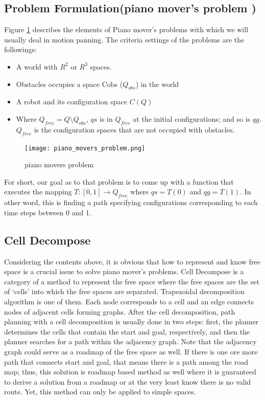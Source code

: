 \documentclass[11pt]{article}
\begin{document}
\subsection{Problem Formulation(piano mover's problem )}
Figure \ref{fig:pmp} describes the elements of Piano mover’s problems with which we will usually deal in motion panning. The criteria settings of the problems are the followings:
\begin{itemize}
\item A world with $R^2$ or $R^3$ spaces.  
\item Obstacles occupies a space Cobs ($Q_{obs}$) in the world
\item A robot and its configuration space $C(Q)$ 
\item Where $Q_{free} = Q\setminus Q_{obs}$, $qs$ is in $Q_{free}$ at the initial configurations; and so is $qg$. $Q_{free}$ is the configuration spaces that are not occupied with obstacles. 
\end{itemize}
\begin{figure}[h]
  \centering
  \texttt{[image: piano\_movers\_problem.png]}
  \label{fig:pmp}
  \caption{piano movers problem}
\end{figure}
For short, our goal as to that problem is to come up with a function that executes the mapping $T:[0, 1] \rightarrow Q_{free}$ where $qs = T(0)$ and $qg = T(1)$. In other word, this is finding a path specifying configurations corresponding to each time steps between 0 and 1. 
\subsection{Cell Decompose}
Considering the contents above, it is obvious that how to represent and know free space is a crucial issue to solve piano mover’s problems. Cell Decompose is a category of a method to represent the free space where the free spaces are the set of ‘cells’ into which the free spaces are separated. Trapezoidal decomposition algorithm is one of them. Each node corresponds to a cell and an edge connects nodes of adjacent cells forming graphs. After the cell decomposition, path planning with a cell decomposition is usually done in two steps: first, the planner determines the cells that contain the start and goal, respectively, and then the planner searches for a path within the adjacency graph. Note that the adjacency graph could serve as a roadmap of the free space as well. If there is one ore more path that connects start and goal, that means there is a path among the road map; thus, this solution is roadmap based method as well where it is guaranteed to derive a solution from a roadmap or at the very least know there is no valid route. Yet, this method can only be applied to simple spaces.
\end{document}
